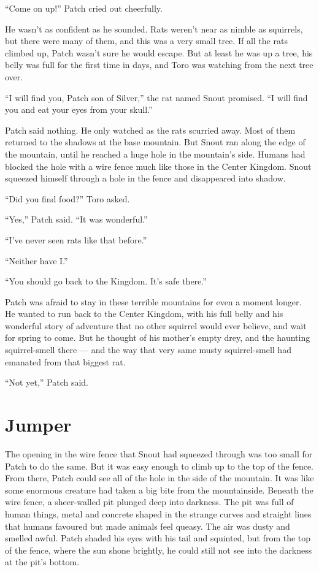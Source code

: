 \documentclass[ebook,oneside,openany,17pt]{memoir}
\renewcommand{\thechapter}{\Roman{chapter}}
\newcounter{sections}
\newcommand{\sections}[1]{%
  \section*{#1}
  \addtocounter{sections}{1}%
  \pdfbookmark[1]{#1}{section.\thechapter.\thesections}}
\begin{document}
“Come on up!” Patch cried out cheerfully.

He wasn’t as confident as he sounded. Rats weren’t near as nimble as
squirrels, but there were many of them, and this was a very small
tree. If all the rats climbed up, Patch wasn’t sure he would
escape. But at least he was up a tree, his belly was full for the
first time in days, and Toro was watching from the next tree over.

“I will find you, Patch son of Silver,” the rat named Snout
promised. “I will find you and eat your eyes from your skull.”

Patch said nothing. He only watched as the rats scurried away. Most of
them returned to the shadows at the base mountain. But Snout ran along
the edge of the mountain, until he reached a huge hole in the
mountain’s side. Humans had blocked the hole with a wire fence much
like those in the Center Kingdom. Snout squeezed himself through a
hole in the fence and disappeared into shadow.

“Did you find food?” Toro asked.

“Yes,” Patch said. “It was wonderful.”

“I’ve never seen rats like that before.”

“Neither have I.”

“You should go back to the Kingdom. It’s safe there.”

Patch was afraid to stay in these terrible mountains for even a moment
longer. He wanted to run back to the Center Kingdom, with his full
belly and his wonderful story of adventure that no other squirrel
would ever believe, and wait for spring to come. But he thought of his
mother’s empty drey, and the haunting squirrel-smell there — and the
way that very same musty squirrel-smell had emanated from that biggest
rat.

“Not yet,” Patch said.


\sections{Jumper}

The opening in the wire fence that Snout had squeezed through was too
small for Patch to do the same. But it was easy enough to climb up to
the top of the fence. From there, Patch could see all of the hole in
the side of the mountain. It was like some enormous creature had taken
a big bite from the mountainside. Beneath the wire fence, a
sheer-walled pit plunged deep into darkness. The pit was full of human
things, metal and concrete shaped in the strange curves and straight
lines that humans favoured but made animals feel queasy. The air was
dusty and smelled awful. Patch shaded his eyes with his tail and
squinted, but from the top of the fence, where the sun shone brightly,
he could still not see into the darkness at the pit’s bottom.
\end{document}
